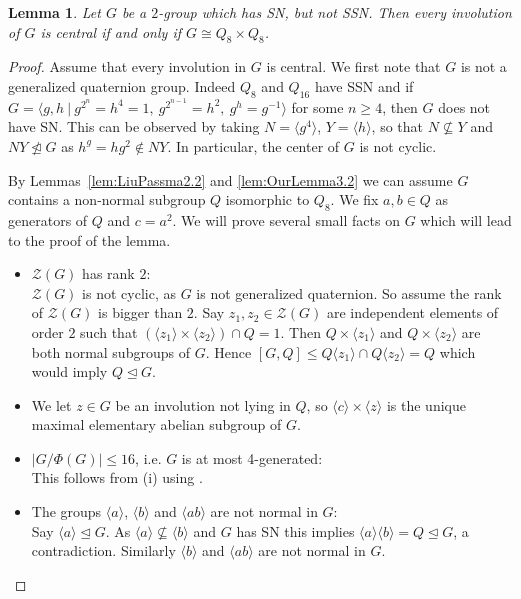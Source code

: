 \documentclass[a4paper,10pt]{amsart}
\newtheorem{lemma}{Lemma}[section]
\theoremstyle{definition}
\theoremstyle{remark}
\newcommand{\ZZ}{\mathcal{Z}}
\begin{document}
\begin{lemma}\label{lem:Q8timesQ8}
Let $G$ be a $2$-group which has SN, but not SSN. Then every involution of $G$ is central if and only if $G \cong Q_8 \times Q_8$.
\end{lemma}
\begin{proof}
Assume that every involution in $G$ is central. We first note that $G$ is not a generalized quaternion group. Indeed $Q_8$ and $Q_{16}$ have SSN \cite[Theorem 2.3, BJ6]{Liu} and if $G = \langle g, h \ | \ g^{2^n} = h^4 = 1, \ g^{2^{n-1}} = h^2, \ g^h = g^{-1} \rangle$ for some $n \geq 4$, then $G$ does not have SN. This can be observed by taking $N = \langle g^4 \rangle$, $Y = \langle h \rangle$, so that $N \not\subseteq Y$ and $NY \ntrianglelefteq G$ as $h^g = hg^2 \notin NY$. In particular, the center of $G$ is not cyclic.

By Lemmas~\ref{lem:LiuPassma2.2} and \ref{lem:OurLemma3.2} we can assume $G$ contains a non-normal subgroup $Q$ isomorphic to $Q_8$. We fix $a,b \in Q$ as generators of $Q$ and $c = a^2$. We will prove several small facts on $G$ which will lead to the proof of the lemma.
\begin{itemize}
\item[(i)] $\ZZ(G)$ has rank $2$:\\
$\ZZ(G)$ is not cyclic, as $G$ is not generalized quaternion. So assume the rank of $\ZZ(G)$ is bigger than $2$. Say $z_1, z_2 \in \ZZ(G)$ are independent elements of order $2$ such that $(\langle z_1 \rangle \times \langle z_2 \rangle) \cap Q = 1$. Then $Q \times \langle z_1 \rangle$ and $Q \times \langle z_2 \rangle$ are both normal subgroups of $G$. Hence $[G,Q] \leq Q\langle z_1 \rangle \cap Q\langle z_2 \rangle = Q$ which would imply $Q\unlhd G$.

\item[Convention:] We let $z \in G$ be an involution not lying in $Q$, so $\langle c \rangle \times \langle z \rangle$ is the unique maximal elementary abelian subgroup of $G$.

\item[(ii)] $|G/\Phi(G)| \leq 16$, i.e. $G$ is at most 4-generated:\\
This follows from (i) using \cite[Four Generator Theorem]{MacWilliams}.

\item[(iii)] The groups $\langle a \rangle$, $\langle b \rangle$ and $\langle ab \rangle$ are not normal in $G$:\\
Say $\langle a \rangle \unlhd G$. As $\langle a \rangle \not\subseteq \langle b \rangle$ and $G$ has SN this implies $\langle a \rangle \langle b \rangle = Q \unlhd G$, a contradiction. Similarly $\langle b \rangle$ and $\langle ab \rangle$ are not normal in $G$.


\end{itemize}
\end{proof}
\end{document}
